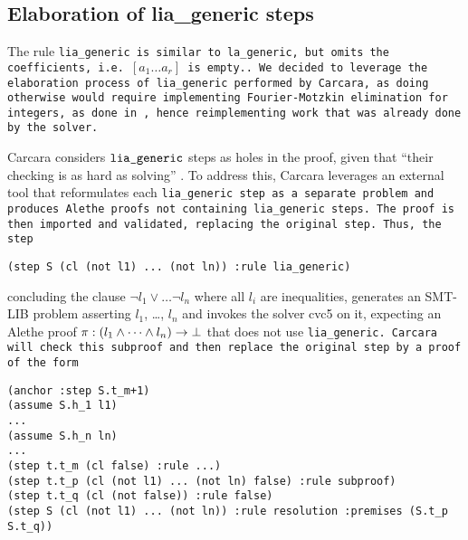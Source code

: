 \subsection{Elaboration of lia\_generic steps}
\label{ssec:elaboration-lia}

The rule \tt{lia\_generic} is similar to \tt{la\_generic}, but omits the coefficients,
i.e.\ \colorbox{orange!30}{$[a_1 \dots a_r]$} is empty..
We decided to leverage the elaboration process of \tt{lia\_generic} performed by Carcara, as doing otherwise would require implementing Fourier-Motzkin elimination for integers, as done in \cite{micromega,omegatest}, hence reimplementing work that was already done by the solver.

Carcara considers $\tt{lia\_generic}$ steps as holes in the proof, given that ``their checking is as hard as solving'' \cite[\S 3.2]{carcara}.
To address this, Carcara leverages an external tool that reformulates each \tt{lia\_generic} step as a separate problem and produces Alethe proofs not containing \tt{lia\_generic} steps.
The proof is then imported and validated, replacing the original step.
Thus, the step
%
\begin{lstlisting}[language=SMT, frame=none, numbers=none]
    (step S (cl (not l1) ... (not ln)) :rule lia_generic)
\end{lstlisting}
%
concluding the clause $\neg l_1 \lor \dots \neg l_n$ where all $l_i$ are inequalities, generates an SMT-LIB problem asserting $l_1$, \dots, $l_n$ and invokes the solver cvc5 on it, expecting an Alethe proof $\pi : (l_1 \land \dots \land l_n) \ra \bot$
that does not use \tt{lia\_generic}. Carcara will check this subproof and then replace the original step by a proof of the form

\begin{lstlisting}[language=SMT,caption={Elaboration of \tt{lia\_generic}},label={lst:elab_lia}]
(anchor :step S.t_m+1)
(assume S.h_1 l1)
...
(assume S.h_n ln)
...
(step t.t_m (cl false) :rule ...)
(step t.t_p (cl (not l1) ... (not ln) false) :rule subproof)
(step t.t_q (cl (not false)) :rule false)
(step S (cl (not l1) ... (not ln)) :rule resolution :premises (S.t_p S.t_q))
\end{lstlisting}


